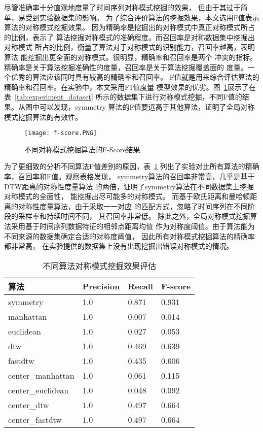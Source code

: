 尽管准确率十分直观地度量了时间序列对称模式挖掘的效果，
但由于其过于简单，易受到实验数据集的影响。
为了综合评价算法的挖掘效果，本文选用F值表示算法的对称模式挖掘效果。
因为精确率是挖掘出的对称模式中真正对称模式所占的比例，表示了
算法挖掘对称模式的准确程度。而召回率是对称数据集中挖掘出对称模式
所占的比例，衡量了算法对于对称模式的识别能力，召回率越高，表明算法
能挖掘出更全面的对称模式。很明显，精确率和召回率是两个
冲突的指标。精确率是关于算法挖掘准确性的度量，召回率是关于算法挖掘覆盖面的
度量。一个优秀的算法应该同时具有较高的精确率和召回率。
F值就是用来综合评估算法的精确率和召回率。在实验中，本文采用F1值度量
模型效果的优劣。图~\ref{fig:fscore_compare}展示了在表~\ref{tab:experiment_dataset}
所示的数据集下进行对称模式挖掘，不同F值的结果。从图中可以发现，symmetry
算法的F值要远高于其他算法，证明了全局对称模式挖掘算法的有效性。
\begin{figure}
  \centering
  \texttt{[image: f-score.PNG]}
  \caption{不同对称模式挖掘算法的F-Score结果}
  \label{fig:fscore_compare}
\end{figure}

为了更细致的分析不同算法F值差别的原因，表~\ref{tab:experiment_global_algo}
列出了实验对比所有算法的精确率，召回率和F值。观察表格发现，
symmetry算法的召回率非常高，几乎是基于DTW距离的对称性度量算法
的两倍，证明了symmetry算法在不同数据集上挖掘对称模式的全面性，
能挖掘出尽可能多的对称模式。
而基于欧氏距离和曼哈顿距离的对称性度量算法，由于采取一一对应
的匹配方式，忽略了时间序列在不同阶段的采样率和持续时间不同，
其召回率非常低。
除此之外，全局对称模式挖掘算法采用基于时间序列数据特征的相邻点距离均值
作为对称度阈值。由于算法能为不同来源的数据集确定合适的对称度阈值，
因此所有对称模式挖掘算法的精确率都非常高，
在实验提供的数据集上没有出现挖掘出错误对称模式的情况。


\begin{table}
  \centering
  \caption{不同算法对称模式挖掘效果评估}
  \begin{tabular}{llll}
    \toprule
    算法              & Precision & Recall & F-score \\
    \midrule
    symmetry          & 1.0       & 0.871  & 0.931   \\
    manhattan         & 1.0       & 0.007  & 0.014   \\
    euclidean         & 1.0       & 0.027  & 0.053   \\
    dtw               & 1.0       & 0.469  & 0.639   \\
    fastdtw           & 1.0       & 0.435  & 0.606   \\
    center\_manhattan & 1.0       & 0.061  & 0.115   \\
    center\_euclidean & 1.0       & 0.048  & 0.092   \\
    center\_dtw       & 1.0       & 0.497  & 0.664   \\
    center\_fastdtw   & 1.0       & 0.497  & 0.664   \\
    \bottomrule
  \end{tabular}
  \label{tab:experiment_global_algo}
\end{table}

